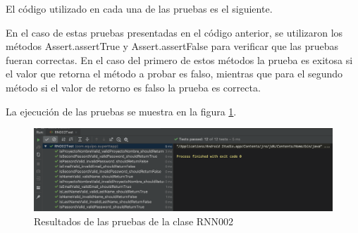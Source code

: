 El código utilizado en cada una de las pruebas es el siguiente.



En el caso de estas pruebas presentadas en el código anterior, se utilizaron los métodos Assert.assertTrue y Assert.assertFalse para verificar que las pruebas fueran correctas. En el caso del primero de estos métodos la prueba es exitosa si el valor que retorna el método a probar es falso, mientras que para el segundo método si el valor de retorno es falso la prueba es correcta.

La ejecución de las pruebas se muestra en la figura \ref{fig:rnn002Test}.

\begin{figure}[h]
	\centering
	\includegraphics[width=450px]{capitulo6/unitarias/img/rnn002Test.png}
	\caption{Resultados de las pruebas de la clase RNN002}
	\label{fig:rnn002Test}
\end{figure}